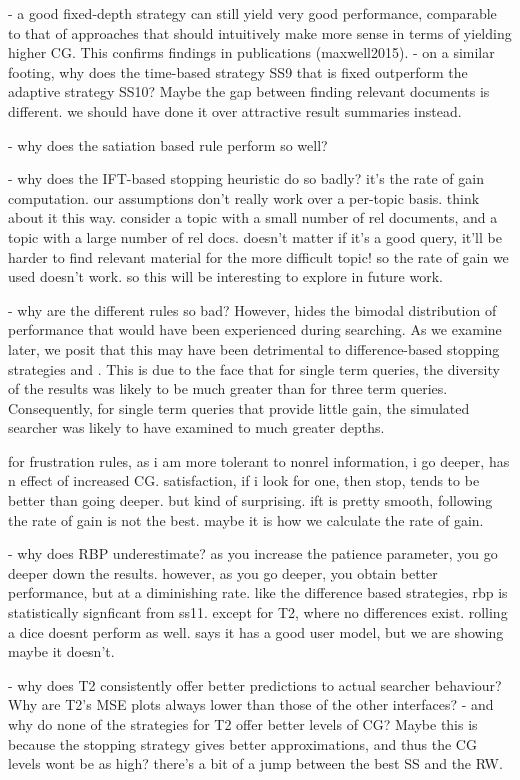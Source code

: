 - a good fixed-depth strategy can still yield very good performance, comparable to that of approaches that should intuitively make more sense in terms of yielding higher CG. This confirms findings in publications (maxwell2015).
- on a similar footing, why does the time-based strategy SS9 that is fixed outperform the adaptive strategy SS10? Maybe the gap between finding relevant documents is different. we should have done it over attractive result summaries instead.

- why does the satiation based rule perform so well?

- why does the IFT-based stopping heuristic do so badly? it's the rate of gain computation. our assumptions don't really work over a per-topic basis. think about it this way. consider a topic with a small number of rel documents, and a topic with a large number of rel docs. doesn't matter if it's a good query, it'll be harder to find relevant material for the more difficult topic! so the rate of gain we used doesn't work. so this will be interesting to explore in future work.

- why are the different rules so bad? However,  hides the bimodal distribution of performance that would have been experienced during searching. As we examine later, we posit that this may have been detrimental to difference-based stopping strategies  and . This is due to the face that for single term queries, the diversity of the results was likely to be much greater than for three term queries. Consequently, for single term queries that provide little gain, the simulated searcher was likely to have examined to much greater depths. 

for frustration rules, as i am more tolerant to nonrel information, i go deeper, has n effect of increased CG.
satisfaction, if i look for one, then stop, tends to be better than going deeper. but kind of surprising.
ift is pretty smooth, following the rate of gain is not the best. maybe it is how we calculate the rate of gain.

- why does RBP underestimate? as you increase the patience parameter, you go deeper down the results. however, as you go deeper, you obtain better performance, but at a diminishing rate. like the difference based strategies, rbp is statistically signficant from ss11. except for T2, where no differences exist. rolling a dice doesnt perform as well. says it has a good user model, but we are showing maybe it doesn't.

- why does T2 consistently offer better predictions to actual searcher behaviour? Why are T2's MSE plots always lower than those of the other interfaces?
    - and why do none of the strategies for T2 offer better levels of CG? Maybe this is because the stopping strategy gives better approximations, and thus the CG levels wont be as high? there's a bit of a jump between the best SS and the RW.

